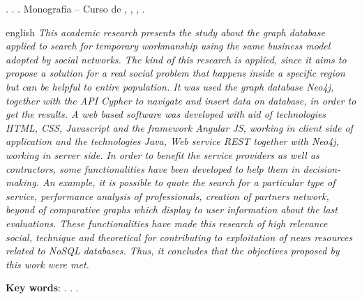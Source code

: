 
\begin{OnehalfSpacing} 

\noindent \imprimirAutorCitacaoMaiuscula. {\bfseries\imprimirtitulo}. {\imprimirdata}.  Monografia -- Curso de {\MakeUppercase\imprimircurso}, {\imprimirinstituicao}, {\imprimirlocal}, {\imprimirdata}.

\vspace{\onelineskip}
\vspace{\onelineskip}
\vspace{\onelineskip}
\vspace{\onelineskip}

\begin{resumo}[Abstract]%
\begin{otherlanguage*}{english}%
\textit{
\noindent This academic research presents the study about the graph database applied to search for temporary workmanship using the same business model adopted by social networks. The kind of this research is applied, since it aims to propose a solution for a real social problem that happens inside a specific region but can be helpful to entire population. It was used the graph database Neo4j, together with the API Cypher to navigate and insert data on database, in order to get the results. A web based software was developed with aid of technologies HTML, CSS, Javascript and the framework Angular JS, working in client side of application and the technologies Java, Web service REST together with Neo4j, working in server side. In order to benefit the service providers as well as contractors, some functionalities have been developed to help them in decision-making. An example, it is possible to quote the search for a particular type of service, performance analysis of professionals, creation of partners network, beyond of comparative graphs which display to user information about the last evaluations. These functionalities have made this research of high relevance social, technique and theoretical for contributing to exploitation of news resources related to NoSQL databases. Thus, it concludes that the objectives proposed by this work were met.
}

\vspace{\onelineskip}
\vspace*{\fill}
\noindent \textbf{Key words}: \imprimirKeyWordOne. \imprimirKeyWordTwo. \imprimirKeyWordThree.
\end{otherlanguage*}
\vspace{\onelineskip}
\end{resumo}

\end{OnehalfSpacing}

